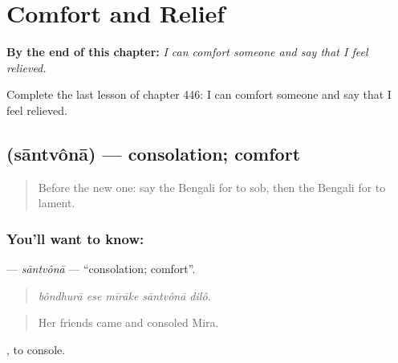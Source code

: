 
\chapter{Comfort and Relief}
\label{ch:bn-comfort-and-relief}

\begin{chapteropening}
\textbf{By the end of this chapter:} \emph{I can comfort someone and say that I feel relieved.}

Complete the last lesson of chapter 446: I can comfort someone and say that I feel relieved.
\end{chapteropening}

\section[\texorpdfstring{\bn{সান্ত্বনা} (sāntvônā)}{সান্ত্বনা (sāntvônā)}]{ (sāntvônā) — consolation; comfort}

\label{lesson:BN-C446-santvona}



\begin{quote}
Before the new one: say the Bengali for to sob, then the Bengali for to lament.
\end{quote}

\subsection*{You'll want to know: }
\textbf{} — \emph{sāntvônā} — \textquotedblleft{}consolation; comfort\textquotedblright{}.

\begin{quote}
    
\end{quote}

\begin{quote}
\emph{bôndhurā ese mīrāke sāntvônā dilô.}
\end{quote}

\begin{quote}
Her friends came and consoled Mira.
\end{quote}

 , to console.

